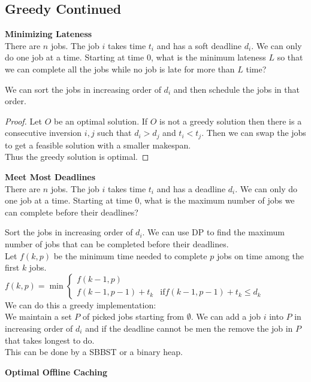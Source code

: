 \documentclass[answers,12pt,addpoints]{exam}
\begin{document}
\begin{questions}
\subsection{Greedy Continued}
\question\textbf{Minimizing Lateness}\\
There are $n$ jobs. The job $i$ takes time $t_i$  and has a soft deadline $d_i$. We can only do one job at a time. Starting at time $0$, what is the minimum lateness $L$ so that we can complete all the jobs while no job is late for more than $L$ time?
\begin{solution}
    We can sort the jobs in increasing order of $d_i$ and then schedule the jobs in that order.
    \begin{proof}
        Let $O$ be an optimal solution. If $O$ is not a greedy solution then there is a consecutive inversion $i,j$ such that $d_i > d_j$ and $t_i < t_j$. Then we can swap the jobs to get a feasible solution with a smaller makespan.\\
        Thus the greedy solution is optimal.
    \end{proof}
\end{solution}
\question\textbf{Meet Most Deadlines}\\
There are $n$ jobs. The job $i$ takes time $t_i$ and has a deadline $d_i$. We can only do one job at a time. Starting at time $0$, what is the maximum number of jobs we can complete before their deadlines?
\begin{solution}
    Sort the jobs in increasing order of $d_i$. We can use DP to find the maximum number of jobs that can be completed before their deadlines.\\
    Let $f(k,p)$ be the minimum time needed to complete $p$ jobs on time among the first $k$ jobs. \\
    $f(k,p) = \min \begin{cases}
        f(k-1,p) \\
        f(k-1,p-1) + t_k & \text{if} f(k-1,p-1) + t_k \leq d_k
    \end{cases}$\\
    We can do this a greedy implementation:\\
    We maintain a set $P$ of picked jobs starting from $\emptyset$. We can add a job $i$ into $P$ in increasing order of $d_i$ and if the deadline cannot be men the remove the job in $P$ that takes longest to do. \\
    This can be done by a SBBST or a binary heap.
\end{solution}
\question\textbf{Optimal Offline Caching}\\

\end{questions}
\end{document}
